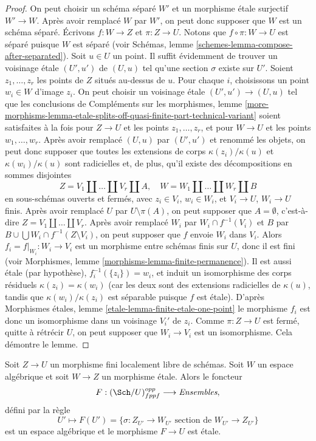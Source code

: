 \begin{proof}
On peut choisir un schéma séparé $W'$ et un morphisme étale surjectif
$W' \to W$. Après avoir remplacé $W$ par $W'$, on peut donc supposer que $W$
est un schéma séparé. Écrivons $f : W \to Z$ et $\pi : Z \to U$.
Notons que $f \circ \pi : W \to U$ est séparé puisque
$W$ est séparé (voir
Schémas, lemme \ref{schemes-lemma-compose-after-separated}).
Soit $u \in U$ un point. Il suffit évidemment
de trouver un voisinage étale $(U', u')$ de $(U, u)$ tel qu'une
section $\sigma$ existe sur $U'$. Soient $z_1, \ldots, z_r$
les points de $Z$ situés au-dessus de $u$. Pour chaque $i$, choisissons un point
$w_i \in W$ d'image $z_i$. On peut choisir un voisinage étale
$(U', u') \to (U, u)$ tel que les conclusions de
Compléments sur les morphismes, lemme
\ref{more-morphisms-lemma-etale-splits-off-quasi-finite-part-technical-variant}
soient satisfaites à la fois pour $Z \to U$ et les points $z_1, \ldots, z_r$,
et pour $W \to U$ et les points $w_1, \ldots, w_r$. Après avoir
remplacé $(U, u)$ par $(U', u')$ et renommé les objets, on peut donc supposer que
toutes les extensions de corps $\kappa(z_i)/\kappa(u)$ et
$\kappa(w_i)/\kappa(u)$ sont radicielles et, de plus,
qu'il existe des décompositions en sommes disjointes
$$
Z = V_1 \amalg \ldots \amalg V_r \amalg A, \quad
W = W_1 \amalg \ldots \amalg W_r \amalg B
$$
en sous-schémas ouverts et fermés,
avec $z_i \in V_i$, $w_i \in W_i$, et $V_i \to U$, $W_i \to U$ finis.
Après avoir remplacé $U$ par $U \setminus \pi(A)$, on peut supposer que
$A = \emptyset$, c'est-à-dire $Z = V_1 \amalg \ldots \amalg V_r$.
Après avoir remplacé $W_i$ par $W_i \cap f^{-1}(V_i)$ et
$B$ par $B \cup \bigcup W_i \cap f^{-1}(Z \setminus V_i)$,
on peut supposer que $f$ envoie $W_i$ dans $V_i$.
Alors $f_i = f|_{W_i} : W_i \to V_i$ est un morphisme entre schémas finis sur $U$,
donc il est fini (voir
Morphismes, lemme \ref{morphisms-lemma-finite-permanence}).
Il est aussi étale (par hypothèse),
$f_i^{-1}(\{z_i\}) = w_i$, et induit un isomorphisme des corps
résiduels $\kappa(z_i) = \kappa(w_i)$ (car les deux sont des extensions radicielles
de $\kappa(u)$, tandis que $\kappa(w_i)/\kappa(z_i)$
est séparable puisque $f$ est étale). D'après
Morphismes étales, lemme \ref{etale-lemma-finite-etale-one-point}
le morphisme $f_i$ est donc un isomorphisme dans un voisinage $V_i'$ de
$z_i$. Comme $\pi : Z \to U$ est fermé, quitte à rétrécir $U$, on peut supposer
que $W_i \to V_i$ est un isomorphisme. Cela démontre le lemme.
\end{proof}

\begin{lemma}
\label{lemma-space-of-sections}
Soit $Z \to U$ un morphisme fini localement libre de schémas.
Soit $W$ un espace algébrique et soit $W \to Z$ un morphisme étale.
Alors le foncteur
$$
F : (\Sch/U)_{fppf}^{opp} \longrightarrow \textit{Ensembles},
$$
défini par la règle
$$
U' \longmapsto
F(U') =
\{\sigma : Z_{U'} \to W_{U'}\text{ section de }W_{U'} \to Z_{U'}\}
$$
est un espace algébrique et le morphisme $F \to U$ est étale.
\end{lemma}

